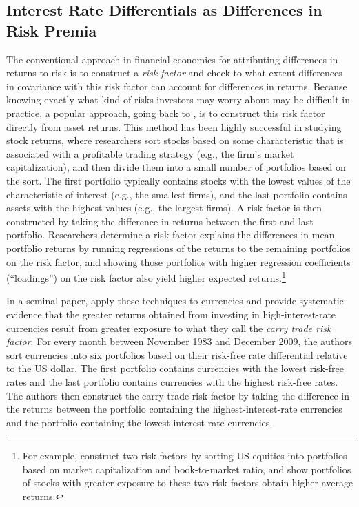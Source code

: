 \documentclass{ar-1col}
\begin{document}
\subsection{Interest Rate Differentials as Differences in Risk Premia \label{sec_RP}}

The conventional approach in financial economics for attributing differences in returns to risk is to construct a \textit{risk factor} and check to what extent differences in covariance with this risk factor can account for differences in returns. Because knowing exactly what kind of risks investors may worry about may be difficult in practice, a popular approach, going back to \cite{Fama1976}, is to construct this risk factor directly from asset returns. This method has been highly successful in studying stock returns, where researchers sort stocks based on some characteristic that is associated with a profitable trading strategy (e.g., the firm's market capitalization), and then divide them into a small number of portfolios based on the sort. The first portfolio typically contains stocks with the lowest values of the characteristic of interest (e.g., the smallest firms), and the last portfolio contains assets with the highest values (e.g., the largest firms). A risk factor is then constructed by taking the difference in returns between the first and last portfolio. Researchers determine a risk factor explains the differences in mean portfolio returns by running regressions of the returns to the remaining portfolios on the risk factor, and showing those portfolios with higher regression coefficients (``loadings'') on the risk factor also yield higher expected returns.\footnote{For example, \citet{FamaFrench1992} construct two risk factors by sorting US equities into portfolios based on market capitalization and book-to-market ratio, and show portfolios of stocks with greater exposure to these two risk factors obtain higher average returns.}

In a seminal paper, \citet{LustigRoussanovVerdelhan2011} apply these techniques to currencies and provide systematic evidence that the greater returns obtained from investing in high-interest-rate currencies result from greater exposure to what they call the \emph{carry trade risk factor}. For every month between November 1983 and December 2009, the authors sort currencies into six portfolios based on their risk-free rate differential relative to the US dollar. The first portfolio contains currencies with the lowest risk-free rates and the last portfolio contains currencies with the highest risk-free rates. The authors then construct the carry trade risk factor by taking the difference in the returns between the portfolio containing the highest-interest-rate currencies and the portfolio containing the lowest-interest-rate currencies.
\end{document}

